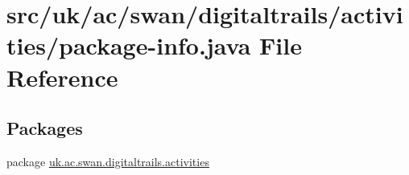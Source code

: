 \hypertarget{activities_2package-info_8java}{\section{src/uk/ac/swan/digitaltrails/activities/package-\/info.java File Reference}
\label{activities_2package-info_8java}
}
\subsection*{Packages}
\begin{DoxyCompactItemize}
\item 
package \hyperlink{namespaceuk_1_1ac_1_1swan_1_1digitaltrails_1_1activities}{uk.\+ac.\+swan.\+digitaltrails.\+activities}
\end{DoxyCompactItemize}
